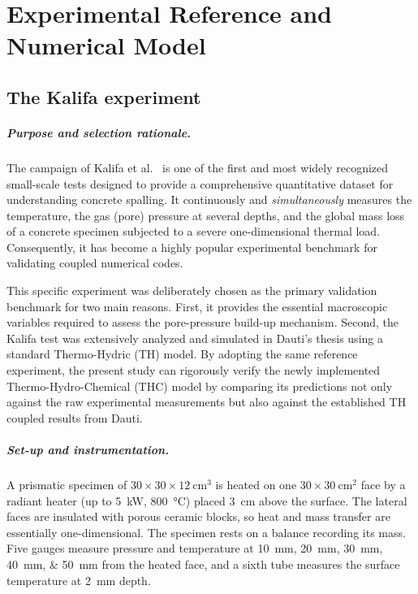 \chapter{Experimental Reference and Numerical Model} \label{chapter3} %
 
\section{The Kalifa experiment} \label{sec:kalifa}

\paragraph{Purpose and selection rationale.} The campaign of Kalifa et al.~\cite{kalifa2000} is one of the first and most widely recognized small-scale tests designed to provide a comprehensive quantitative dataset for understanding concrete spalling. It continuously and \emph{simultaneously} measures the temperature, the gas (pore) pressure at several depths, and the global mass loss of a concrete specimen subjected to a severe one-dimensional thermal load. Consequently, it has become a highly popular experimental benchmark for validating coupled numerical codes.

This specific experiment was deliberately chosen as the primary validation benchmark for two main reasons. First, it provides the essential macroscopic variables required to assess the pore-pressure build-up mechanism. Second, the Kalifa test was extensively analyzed and simulated in Dauti's thesis \cite{dauti2018} using a standard Thermo-Hydric (TH) model. By adopting the same reference experiment, the present study can rigorously verify the newly implemented Thermo-Hydro-Chemical (THC) model by comparing its predictions not only against the raw experimental measurements but also against the established TH coupled results from Dauti.

\paragraph{Set-up and instrumentation.}
A prismatic specimen of $30\times30\times12~\si{\centi\meter\cubed}$ is heated on one $30\times30~\si{\centi\meter\squared}$ face by a radiant heater (up to \SI{5}{\kilo\watt}, \SI{800}{\celsius}) placed \SI{3}{\centi\meter} above the surface. The lateral faces are insulated with porous ceramic blocks, so heat and mass transfer are essentially one-dimensional. The specimen rests on a balance recording its mass. Five gauges measure pressure and temperature at \SIlist{10;20;30;40;50}{\milli\meter} from the heated face, and a sixth tube measures the surface temperature at \SI{2}{\milli\meter} depth.

